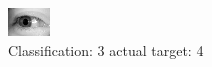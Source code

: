 \begin{figure}[h!]
\begin{center}
\includegraphics[width=0.60\columnwidth]{figures/ID3183_class_3_target_4.png}
\end{center}
\caption{ Classification: 3 actual target: 4}
\label{fig:ID3183_class_3_target_4}
\end{figure}
